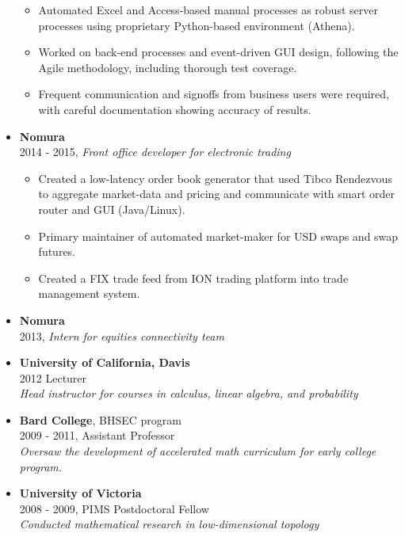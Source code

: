 \documentclass[margin]{res}
\def\tightlist{}
\begin{document}
\begin{resume}
\begin{itemize}
  \begin{itemize}
  \tightlist
  \item
    Automated Excel and Access-based manual processes as robust server
    processes using proprietary Python-based environment (Athena).
  \item
    Worked on back-end processes and event-driven GUI design, following
    the Agile methodology, including thorough test coverage.
  \item
    Frequent communication and signoffs from business users were
    required, with careful documentation showing accuracy of results.
  \end{itemize}
\item
  \textbf{Nomura}\\
  2014 - 2015, \emph{Front office developer for electronic trading}

  \begin{itemize}
  \tightlist
  \item
    Created a low-latency order book generator that used Tibco
    Rendezvous to aggregate market-data and pricing and communicate with
    smart order router and GUI (Java/Linux).
  \item
    Primary maintainer of automated market-maker for USD swaps and swap
    futures.
  \item
    Created a FIX trade feed from ION trading platform into trade
    management system.
  \end{itemize}
\item
  \textbf{Nomura}\\
  2013, \emph{Intern for equities connectivity team}
\item
  \textbf{University of California, Davis}\\
  2012 Lecturer\\
  \emph{Head instructor for courses in calculus, linear algebra, and
  probability}
\item
  \textbf{Bard College}, BHSEC program\\
  2009 - 2011, Assistant Professor\\
  \emph{Oversaw the development of accelerated math curriculum for early
  college program.}
\item
  \textbf{University of Victoria}\\
  2008 - 2009, PIMS Postdoctoral Fellow\\
  \emph{Conducted mathematical research in low-dimensional topology}
\end{itemize}


\end{resume}
\end{document}
